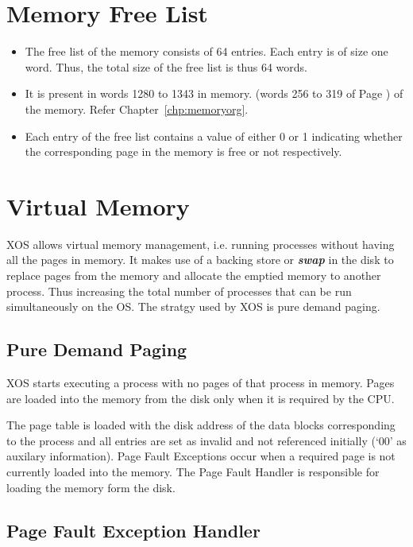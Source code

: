 \documentclass[10pt]{report}
\begin{document}
\section{Memory Free List}
\label{lbl:memlst}

\begin{itemize}
	\item The free list of the memory consists of 64 entries. Each entry is of size one word. Thus, the total size of the free list is thus 64 words.
	\item It is present in words 1280 to 1343 in memory. (words 256 to 319 of Page )
	of the memory. Refer Chapter~\ref{chp:memoryorg}.
	\item Each entry of the free list contains a value of either 0 or 1 indicating whether the corresponding page in the memory is free or not respectively.
\end{itemize}

\section{Virtual Memory}

XOS allows virtual memory management, i.e. running processes without having all the pages in memory. It makes use of a backing store or \textbf{\textit{swap}} in the disk to replace pages from the memory and allocate the emptied memory to another process. Thus increasing the total number of processes that can be run simultaneously on the OS. The stratgy used by XOS is pure demand paging.

\subsection{Pure Demand Paging}
XOS starts executing a process with no pages of that process in memory. Pages are loaded into the memory from the disk only when it is required by the CPU.

 The page table is loaded with the disk address of the data blocks corresponding to the process and all entries are set as invalid and not referenced initially (`00' as auxilary information). Page Fault Exceptions occur when a required page is not currently loaded into the memory. The Page Fault Handler is responsible for loading the memory form the disk.


\subsection{Page Fault Exception Handler}
\end{document}
